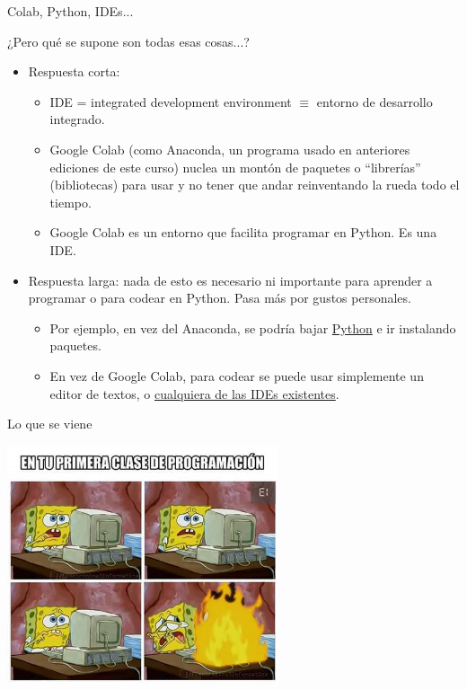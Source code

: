 \documentclass{beamer}
\begin{document}
\begin{frame}{Colab, Python, IDEs...}
\begin{block}{¿Pero qué se supone son todas esas cosas...?}\pause
\begin{itemize}
	\item Respuesta corta:\pause
		\begin{itemize}
			\item IDE = integrated development environment $\equiv$ entorno de desarrollo integrado.\pause
			\item Google Colab (como Anaconda, un programa usado en anteriores ediciones de este curso) nuclea un montón de paquetes o ``librerías'' (bibliotecas) para usar y no tener que andar reinventando la rueda todo el tiempo.\pause
			\item Google Colab es un entorno que facilita programar en Python. Es una IDE.\pause


		\end{itemize}
	\item Respuesta larga: nada de esto es necesario ni importante para aprender a programar o para codear en Python. Pasa más por gustos personales.\pause
	\begin{itemize}
		\item Por ejemplo, en vez del Anaconda, se podría bajar \textcolor{blue}{\href{https://www.python.org/}{Python}} e ir instalando paquetes.\pause		
		\item En vez de Google Colab, para codear se puede usar simplemente un editor de textos, o \textcolor{blue}{\href{https://wiki.python.org/moin/IntegratedDevelopmentEnvironments}{cualquiera de las IDEs existentes}}.
	\end{itemize}
\end{itemize}
\end{block}
\end{frame}

\begin{frame}{Lo que se viene}
\pause
\begin{center}
\includegraphics[height=7cm, scale=0.5]{meme_explosion.png}
\end{center}
\end{frame}
\end{document}

